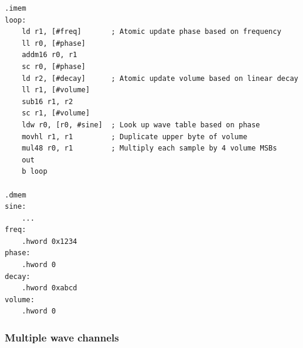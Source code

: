 \begin{lstlisting}
.imem
loop:
	ld r1, [#freq]       ; Atomic update phase based on frequency
	ll r0, [#phase]
	addm16 r0, r1
	sc r0, [#phase]
	ld r2, [#decay]      ; Atomic update volume based on linear decay
	ll r1, [#volume]
	sub16 r1, r2
	sc r1, [#volume]
	ldw r0, [r0, #sine]  ; Look up wave table based on phase
	movhl r1, r1         ; Duplicate upper byte of volume
	mul48 r0, r1         ; Multiply each sample by 4 volume MSBs
	out
	b loop

.dmem
sine:
	...
freq:
	.hword 0x1234
phase:
	.hword 0
decay:
	.hword 0xabcd
volume:
	.hword 0
\end{lstlisting}

\subsubsection{Multiple wave channels}

